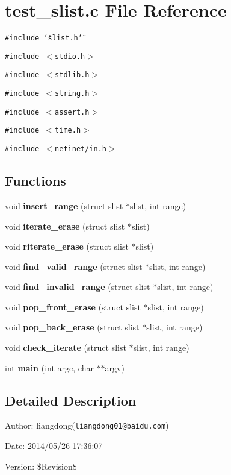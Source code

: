 \section{test\_\-slist.c File Reference}
\label{test__slist_8c}
{\tt \#include \char`\"{}slist.h\char`\"{}}\par
{\tt \#include $<$stdio.h$>$}\par
{\tt \#include $<$stdlib.h$>$}\par
{\tt \#include $<$string.h$>$}\par
{\tt \#include $<$assert.h$>$}\par
{\tt \#include $<$time.h$>$}\par
{\tt \#include $<$netinet/in.h$>$}\par
\subsection*{Functions}
\begin{CompactItemize}
\item 
void {\bf insert\_\-range} (struct slist $\ast$slist, int range)\label{test__slist_8c_a0}

\item 
void {\bf iterate\_\-erase} (struct slist $\ast$slist)\label{test__slist_8c_a1}

\item 
void {\bf riterate\_\-erase} (struct slist $\ast$slist)\label{test__slist_8c_a2}

\item 
void {\bf find\_\-valid\_\-range} (struct slist $\ast$slist, int range)\label{test__slist_8c_a3}

\item 
void {\bf find\_\-invalid\_\-range} (struct slist $\ast$slist, int range)\label{test__slist_8c_a4}

\item 
void {\bf pop\_\-front\_\-erase} (struct slist $\ast$slist, int range)\label{test__slist_8c_a5}

\item 
void {\bf pop\_\-back\_\-erase} (struct slist $\ast$slist, int range)\label{test__slist_8c_a6}

\item 
void {\bf check\_\-iterate} (struct slist $\ast$slist, int range)\label{test__slist_8c_a7}

\item 
int {\bf main} (int argc, char $\ast$$\ast$argv)\label{test__slist_8c_a8}

\end{CompactItemize}


\subsection{Detailed Description}
\begin{Desc}
\item[Author:]liangdong({\tt liangdong01@baidu.com}) \end{Desc}
\begin{Desc}
\item[Date:]2014/05/26 17:36:07 \end{Desc}
\begin{Desc}
\item[Version:]\$Revision\$ \end{Desc}
